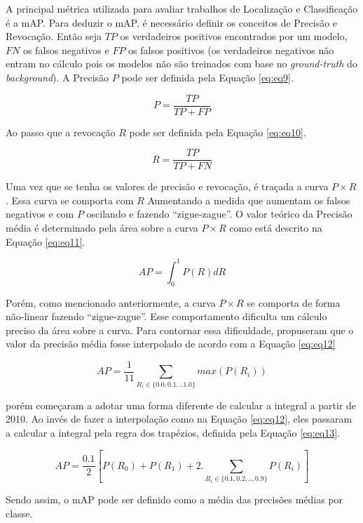 A principal métrica utilizada para avaliar trabalhos de Localização e Classificação é a \ac{mAP}. Para deduzir o \ac{mAP}, é necessário definir os conceitos de Precisão e Revocação. Então seja $TP$ os verdadeiros positivos encontrados por um modelo, $FN$ os falsos negativos e $FP$ os falsos positivos (os verdadeiros negativos não entram no cálculo pois os modelos não são treinados com base no \textit{ground-truth} do \textit{background}). A Precisão $P$ pode ser definida pela Equação \ref{eq:eq9}.

\begin{equation}
	\label{eq:eq9}
	P = \dfrac{TP}{TP+FP}
\end{equation}

\noindent
Ao passo que a revocação $R$ pode ser definida pela Equação \ref{eq:eq10}.

\begin{equation}
	\label{eq:eq10}
	R = \dfrac{TP}{TP+FN}
\end{equation}

Uma vez que se tenha os valores de precisão e revocação, é traçada a curva $P \times R$. Essa curva se comporta com $R$ Aumentando a medida que aumentam os falsos negativos e com $P$ oscilando e fazendo ``zigue-zague''. O valor teórico da Precisão média é determinado pela área sobre a curva $P \times R$ como está descrito na Equação \ref{eq:eq11}.

\begin{equation}
	\label{eq:eq11}
	AP = \int_{0}^{1}P(R)dR
\end{equation}

Porém, como mencionado anteriormente, a curva $P \times R$ se comporta de forma não-linear fazendo ``zigue-zague''. Esse comportamento dificulta um cálculo preciso da área sobre a curva. Para contornar essa dificuldade,  propuseram que o valor da precisão média fosse interpolado de acordo com a Equação \ref{eq:eq12}

\begin{equation}
	\label{eq:eq12}
	AP = \dfrac{1}{11} \sum_{R_i \in \{0.0, 0.1, .. 1.0\}} max(P(R_i))
\end{equation}

 porém começaram a adotar uma forma diferente de calcular a integral a partir de 2010. Ao invés de fazer a interpolação como na Equação \ref{eq:eq12}, eles passaram a calcular a integral pela regra dos trapézios, definida pela Equação \ref{eq:eq13}.

\begin{equation}
	\label{eq:eq13}
	AP = \dfrac{0.1}{2}[P(R_0) + P(R_1) + 2.\sum_{R_i \in \{0.1, 0.2, .., 0.9\}}P(R_i)]
\end{equation}

Sendo assim, o \ac{mAP} pode ser definido como a média das precisões médias por classe.